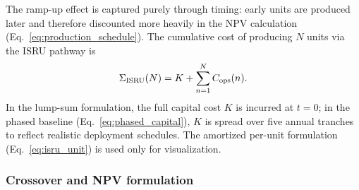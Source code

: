 \documentclass[5p,twocolumn]{elsarticle}
\begin{document}
\begin{table}[htbp]
\centering
\caption{ISRU production yield sensitivity (deterministic, $r = 5\%$, phased $K$). Baseline $N^* = 3{,}749$ at $Y = 1.0$.}
\label{tab:yield_sensitivity}
\small
{}
\end{table}

The ramp-up effect is captured purely through timing: early units are produced later and therefore discounted more heavily in the NPV calculation (Eq.~\ref{eq:production_schedule}). The cumulative cost of producing $N$ units via the ISRU pathway is
\begin{equation}\small
  \Sigma_{\mathrm{ISRU}}(N) = K + \sum_{n=1}^{N} C_{\mathrm{ops}}(n).
  \label{eq:isru_cum}
\end{equation}
In the lump-sum formulation, the full capital cost $K$ is incurred at $t=0$; in the phased baseline (Eq.~\ref{eq:phased_capital}), $K$ is spread over five annual tranches to reflect realistic deployment schedules. The amortized per-unit formulation (Eq.~\ref{eq:isru_unit}) is used only for visualization.

\subsubsection{Crossover and NPV formulation}
\end{document}
